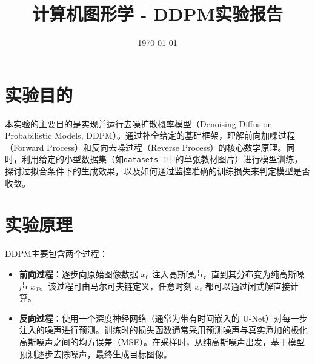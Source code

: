 \documentclass[11pt]{ctexart}
\title{计算机图形学 - DDPM实验报告}
\author{}
\date{\today}
\begin{document}
\maketitle

\section{实验目的}
本实验的主要目的是实现并运行去噪扩散概率模型（Denoising Diffusion Probabilistic Models, DDPM）。通过补全给定的基础框架，理解前向加噪过程（Forward Process）和反向去噪过程（Reverse Process）的核心数学原理。同时，利用给定的小型数据集（如\texttt{datasets-1}中的单张教材图片）进行模型训练，探讨过拟合条件下的生成效果，以及如何通过监控准确的训练损失来判定模型是否收敛。

\section{实验原理}
DDPM主要包含两个过程：
\begin{itemize}
    \item \textbf{前向过程}：逐步向原始图像数据 $x_0$ 注入高斯噪声，直到其分布变为纯高斯噪声 $x_T$。该过程可由马尔可夫链定义，任意时刻 $x_t$ 都可以通过闭式解直接计算。
    \item \textbf{反向过程}：使用一个深度神经网络（通常为带有时间嵌入的 U-Net）对每一步注入的噪声进行预测。训练时的损失函数通常采用预测噪声与真实添加的极化高斯噪声之间的均方误差（MSE）。在采样时，从纯高斯噪声出发，基于模型预测逐步去除噪声，最终生成目标图像。
\end{itemize}
\end{document}
